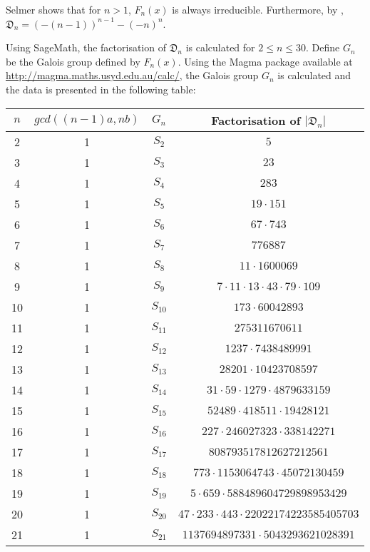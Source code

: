 \documentclass[12pt]{extarticle}
\newcommand{\<}{\langle}
\renewcommand{\>}{\rangle}
\theoremstyle{definition}
\begin{document}
  Selmer \cite{SELMER} shows that for $n>1$, $F_n(x)$ is always irreducible. Furthermore, by , $\mathfrak{D}_n= (-(n-1))^{n-1} - (-n)^{n}$. \par 
Using SageMath, the factorisation of $\mathfrak{D}_n$ is calculated for $2 \leq n \leq 30$. Define $G_n$ be the Galois group defined by $F_n(x)$. Using the Magma package available at \url{http://magma.maths.usyd.edu.au/calc/}, the Galois group $G_n$ is calculated and the data is presented in the following table:
\begin{center}
 \begin{tabular}{||c | c | c | c||} 
 \hline
 $n$ & $gcd((n-1)a,nb)$ & $G_n$ & Factorisation of $|\mathfrak{D}_n|$ \\ [0.5ex] 
 \hline\hline
2 & 1 & $S_{2}$ & $5$ \\
\hline
3 & 1 & $S_{3}$ & $23$ \\
\hline
4 & 1 & $S_{4}$ & $283$ \\
\hline
5 & 1 & $S_{5}$ & $19 \cdot 151$ \\
\hline
6 & 1 & $S_{6}$ & $67 \cdot 743$ \\
\hline
7 & 1 & $S_{7}$ & $776887$ \\
\hline
8 & 1 & $S_{8}$ & $11 \cdot 1600069$ \\
\hline
9 & 1 & $S_{9}$ & $7 \cdot 11 \cdot 13 \cdot 43 \cdot 79 \cdot 109$ \\
\hline
10 & 1 & $S_{10}$ & $173 \cdot 60042893$ \\
\hline
11 & 1 & $S_{11}$ & $275311670611$ \\
\hline
12 & 1 & $S_{12}$ & $1237 \cdot 7438489991$ \\
\hline
13 & 1 & $S_{13}$ & $28201 \cdot 10423708597$ \\
\hline
14 & 1 & $S_{14}$ & $31 \cdot 59 \cdot 1279 \cdot 4879633159$ \\
\hline
15 & 1 & $S_{15}$ & $52489 \cdot 418511 \cdot 19428121$ \\
\hline
16 & 1 & $S_{16}$ & $227 \cdot 246027323 \cdot 338142271$ \\
\hline
17 & 1 & $S_{17}$ & $808793517812627212561$ \\
\hline
18 & 1 & $S_{18}$ & $773 \cdot 1153064743 \cdot 45072130459$ \\
\hline
19 & 1 & $S_{19}$ & $5 \cdot 659 \cdot 588489604729898953429$ \\
\hline
20 & 1 & $S_{20}$ & $47 \cdot 233 \cdot 443 \cdot 22022174223585405703$ \\
\hline
21 & 1 & $S_{21}$ & $1137694897331 \cdot 5043293621028391$ \\

\end{tabular}
\end{center}
\end{document}
